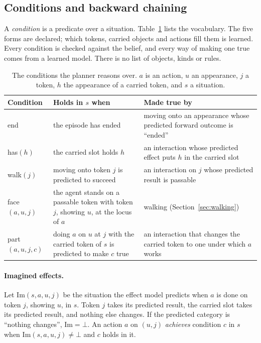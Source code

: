 \documentclass{article}
\newcommand{\cond}[1]{\textsf{#1}}
\begin{document}
\subsection{Conditions and backward chaining}
\label{sec:planning}

A \emph{condition} is a predicate over a situation. Table~\ref{tab:conditions} lists the vocabulary. The five forms are declared; which tokens, carried objects and actions fill them is learned. Every condition is checked against the belief, and every way of making one true comes from a learned model. There is no list of objects, kinds or rules.

\begin{table}[t]
    \caption{The conditions the planner reasons over. $a$ is an action, $u$ an appearance, $j$ a token, $h$ the appearance of a carried token, and $s$ a situation.}
    \centering
    \small
    \begin{tabular}{>{\raggedright\arraybackslash}p{2.6cm} >{\raggedright\arraybackslash}p{5.0cm} >{\raggedright\arraybackslash}p{5.2cm}}
        \toprule
        Condition & Holds in $s$ when & Made true by \\
        \midrule
        \cond{end} & the episode has ended & moving onto an appearance whose predicted forward outcome is ``ended'' \\
        \cond{has}$(h)$ & the carried slot holds $h$ & an interaction whose predicted effect puts $h$ in the carried slot \\
        \cond{walk}$(j)$ & moving onto token $j$ is predicted to succeed & an interaction on $j$ whose predicted result is passable \\
        \cond{face}$(a,u,j)$ & the agent stands on a passable token with token $j$, showing $u$, at the locus of $a$ & walking (Section~\ref{sec:walking}) \\
        \cond{part}$(a,u,j,c)$ & doing $a$ on $u$ at $j$ with the carried token of $s$ is predicted to make $c$ true & an interaction that changes the carried token to one under which $a$ works \\
        \bottomrule
    \end{tabular}
    \label{tab:conditions}
\end{table}

\paragraph{Imagined effects.} Let $\mathrm{Im}(s,a,u,j)$ be the situation the effect model predicts when $a$ is done on token $j$, showing $u$, in $s$. Token $j$ takes its predicted result, the carried slot takes its predicted result, and nothing else changes. If the predicted category is ``nothing changes'', $\mathrm{Im}=\bot$. An action $a$ on $(u,j)$ \emph{achieves} condition $c$ in $s$ when $\mathrm{Im}(s,a,u,j)\neq\bot$ and $c$ holds in it.
\end{document}
